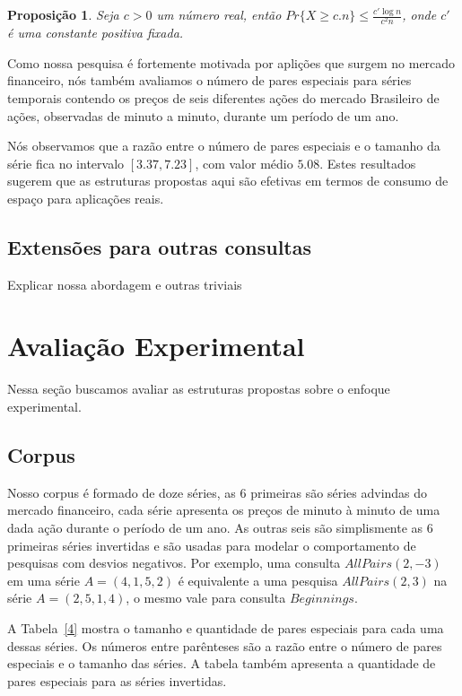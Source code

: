 \documentclass[12pt]{article}
\newtheorem{prop}[thm]{Proposição}
\begin{document}
\begin{prop}
Seja $c>0$ um número real, então $Pr\{X \ge c.n\} \le \frac{c' \log n}{c^2n}$, onde
$c'$ é uma constante positiva fixada.
\end{prop}

Como nossa pesquisa é fortemente motivada por aplições que surgem no mercado
financeiro, nós também avaliamos o número de pares especiais para séries temporais
contendo os preços de seis diferentes ações do mercado Brasileiro de ações, observadas
de minuto a minuto, durante um período de um ano. 

Nós observamos que a razão entre o número de pares especiais e o tamanho da série fica no intervalo
$[3.37, 7.23]$, com valor médio $5.08$. Estes resultados sugerem que as estruturas propostas aqui são
 efetivas em termos de consumo de espaço para aplicações reais.  


\subsection{Extensões para outras consultas}
 Explicar nossa abordagem e outras triviais

\section{Avaliação Experimental}

Nessa seção buscamos avaliar as estruturas propostas sobre o enfoque experimental.



\subsection{Corpus}

Nosso corpus é formado de doze séries, as 6 primeiras são séries advindas do mercado financeiro, 
cada série apresenta os preços de minuto à minuto de uma dada ação durante o período de um ano. 
As outras seis são simplismente as 6 primeiras séries invertidas e são usadas para modelar
o comportamento de pesquisas com desvios negativos. Por exemplo, uma consulta $AllPairs(2, -3)$
em uma série $A=(4, 1, 5, 2)$ é equivalente a uma pesquisa $AllPairs(2, 3)$ na série $A=(2, 5, 1, 4)$,
o mesmo vale para consulta $Beginnings$.

A Tabela~\ref{4} mostra o tamanho e quantidade de pares especiais para cada uma dessas séries.
Os números entre parênteses são a razão entre o número de pares especiais e o tamanho das séries.
A tabela também apresenta a quantidade de pares especiais para as séries invertidas.
 
\end{document}
